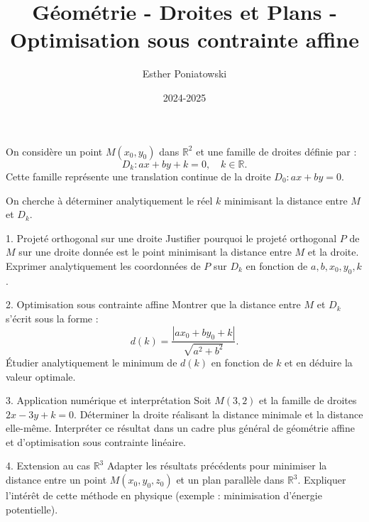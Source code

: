 \documentclass[10pt,a4paper]{article}
\title{Géométrie - Droites et Plans - Optimisation sous contrainte affine}
\author{Esther Poniatowski}
\date{2024-2025}
\begin{document}
\maketitle

On considère un point $M(x_0, y_0)$ dans $\mathbb{R}^2$ et une famille de droites définie par :
$$
D_k : ax + by + k = 0, \quad k \in \mathbb{R}.
$$
Cette famille représente une translation continue de la droite $D_0 : ax + by = 0$.

On cherche à déterminer analytiquement le réel $k$ minimisant la distance entre $M$ et $D_k$.


1. Projeté orthogonal sur une droite
  \ql Justifier pourquoi le projeté orthogonal $P$ de $M$ sur une droite donnée est le point minimisant la distance entre $M$ et la droite.
  \ql Exprimer analytiquement les coordonnées de $P$ sur $D_k$ en fonction de $a, b, x_0, y_0, k$.

2. Optimisation sous contrainte affine
  \ql Montrer que la distance entre $M$ et $D_k$ s'écrit sous la forme :
   $$
   d(k) = \frac{|ax_0 + by_0 + k|}{\sqrt{a^2 + b^2}}.
   $$
  \ql Étudier analytiquement le minimum de $d(k)$ en fonction de $k$ et en déduire la valeur optimale.

3. Application numérique et interprétation
  \ql Soit $M(3,2)$ et la famille de droites $2x - 3y + k = 0$. Déterminer la droite réalisant la distance minimale et la distance elle-même.
  \ql Interpréter ce résultat dans un cadre plus général de géométrie affine et d'optimisation sous contrainte linéaire.

4. Extension au cas $\mathbb{R}^3$
  \ql Adapter les résultats précédents pour minimiser la distance entre un point $M(x_0, y_0, z_0)$ et un plan parallèle dans $\mathbb{R}^3$.
  \ql Expliquer l'intérêt de cette méthode en physique (exemple : minimisation d'énergie potentielle).
\end{document}
